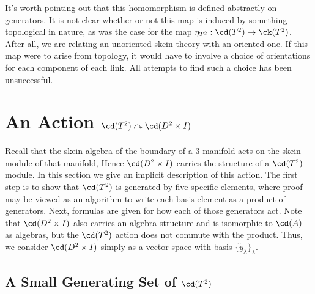 \begin{remark}
It's worth pointing out that this homomorphism is defined abstractly on generators. It is not clear whether or not this map is induced by something topological in nature, as was the case for the map $\eta_{T^2}: \cd(T^2) \to \ck(T^2)$. After all, we are relating an unoriented skein theory with an oriented one. If this map were to arise from topology, it would have to involve a choice of orientations for each component of each link. All attempts to find such a choice has been unsuccessful.
\end{remark}


\section{An Action $\cd(T^2) \curvearrowright \cd(D^2 \times I)$} \label{sec:action}

Recall that the skein algebra of the boundary of a 3-manifold acts on the skein module of that manifold, Hence $\cd(D^2 \times I)$ carries the structure of a $\cd(T^2)$-module. In this section we give an implicit description of this action. The first step is to show that $\cd(T^2)$ is generated by five specific elements, where proof may be viewed as an algorithm to write each basis element as a product of generators. Next, formulas are given for how each of those generators act. Note that $\cd(D^2 \times I)$ also carries an algebra structure and is isomorphic to $\cd(A)$ as algebras, but the $\cd(T^2)$ action does not commute with the product. Thus, we consider $\cd(D^2 \times I)$ simply as a vector space with basis $\{\tilde{y}_\lambda \}_\lambda$.






\subsection{A Small Generating Set of $\cd(T^2)$} \label{sec:generators}


